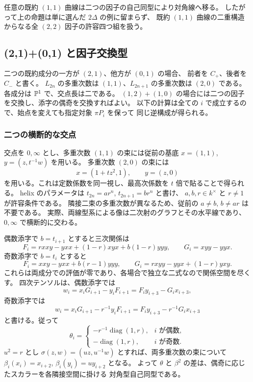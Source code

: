 \begin{remark}
任意の既約 $(1,1)$ 曲線は二つの因子の自己同型により対角線へ移る。
したがって上の命題は単に選んだ $2\Delta$ の例に留まらず、
既約 $(1,1)$ 曲線の二重構造からなる全 $(2,2)$ 因子の許容四つ組を扱う。
\end{remark}

\subsection{(2,1)+(0,1) と因子交換型}

二つの既約成分の一方が $(2,1)$、他方が $(0,1)$ の場合、
前者を $C_+$、後者を $C_-$ と書く。
$L_{2n}$ の多重次数は $(1,1)$、$L_{2n+1}$ の多重次数は $(2,0)$ である。
各成分は $\mathbb P^1$ で、交点長は二である。
$(1,2)+(1,0)$ の場合には二つの因子を交換し、添字の偶奇を交換すればよい。
以下の計算は全ての $i$ で成立するので、始点を変えても指定対象 $\pi P_i$ を保って
同じ逆構成が得られる。

\subsubsection{二つの横断的な交点}

交点を $0,\infty$ とし、多重次数 $(1,1)$ の束には従前の基底
$x=(1,1)$, $y=(z,t^{-1}w)$ を用いる。
多重次数 $(2,0)$ の束には
\[
 x=(1+t z^2,1),\qquad y=(z,0)
\]
を用いる。これは定数係数を同一視し、最高次係数を $t$ 倍で貼ることで得られる。
helix のパラメータは
$t_{2n}=ar^n$, $t_{2n+1}=br^n$ と書け、
$a,b,r\in k^\times$ と $r\ne1$ が許容条件である。
隣接二束の多重次数が異なるため、従前の $a\ne b$, $b\ne ar$ は不要である。
実際、両線型系による像は二次射のグラフとその水平線であり、
$0,\infty$ で横断的に交わる。

偶数添字で $b=t_{i+1}$ とすると三次関係は
\[
 F_i=r xxy-yxx+(1-r)xyx+b(1-r)yyy,
 \qquad G_i=xyy-yyx.
\]
奇数添字で $b=t_i$ とすると
\[
 F_i=xxy-yxx+b(r-1)yyy,
 \qquad G_i=rxyy-yyx+(1-r)yxy.
\]
これらは両成分での評価が零であり、各場合で独立な二式なので関係空間を尽くす。
四次テンソルは、偶数添字では
\[
 w_i=x_iG_{i+1}-y_iF_{i+1}
     =F_i y_{i+3}-G_i x_{i+3},
\]
奇数添字では
\[
 w_i=x_iG_{i+1}-r^{-1}y_iF_{i+1}
     =F_i y_{i+3}-r^{-1}G_i x_{i+3}
\]
と書ける。従って
\[
 \theta_i=
 \begin{cases}
 -r^{-1}\operatorname{diag}(1,r),&i\text{ が偶数},\\
 -\operatorname{diag}(1,r),&i\text{ が奇数}.
 \end{cases}
\]
$u^2=r$ とし $\sigma(z,w)=(uz,u^{-1}w)$ とすれば、両多重次数の束について
$\beta_i(x_i)=x_{i+2}$, $\beta_i(y_i)=u y_{i+2}$ となる。
よって $\theta$ と $\beta^2$ の差は、偶奇に応じたスカラーを各隣接空間に掛ける
対角型自己同型である。

